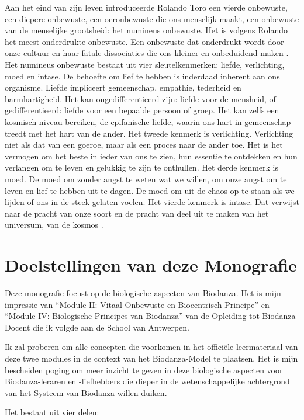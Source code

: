 \documentclass[
  11pt,
]{book}
\begin{document}
Aan het eind van zijn leven introduceerde Rolando Toro een vierde onbewuste, een diepere onbewuste, een oeronbewuste die ons menselijk maakt, een onbewuste van de menselijke grootsheid: het numineus onbewuste. Het is volgens Rolando het meest onderdrukte onbewuste. Een onbewuste dat onderdrukt wordt door onze cultuur en haar fatale dissociaties die ons kleiner en onbeduidend maken \citep{toro2009}.
Het numineus onbewuste bestaat uit vier sleutelkenmerken: liefde, verlichting, moed en intase. De behoefte om lief te hebben is inderdaad inherent aan ons organisme. Liefde impliceert gemeenschap, empathie, tederheid en barmhartigheid. Het kan ongedifferentieerd zijn: liefde voor de mensheid, of gedifferentieerd: liefde voor een bepaalde persoon of groep. Het kan zelfs een kosmisch niveau bereiken, de epifanische liefde, waarin ons hart in gemeenschap treedt met het hart van de ander. Het tweede kenmerk is verlichting. Verlichting niet als dat van een goeroe, maar als een proces naar de ander toe. Het is het vermogen om het beste in ieder van ons te zien, hun essentie te ontdekken en hun verlangen om te leven en gelukkig te zijn te onthullen. Het derde kenmerk is moed. De moed om zonder angst te weten wat we willen, om onze angst om te leven en lief te hebben uit te dagen. De moed om uit de chaos op te staan als we lijden of ons in de steek gelaten voelen. Het vierde kenmerk is intase. Dat verwijst naar de pracht van onze soort en de pracht van deel uit te maken van het universum, van de kosmos \citep{toro2009}.
\newpage 

\section{Doelstellingen van deze Monografie}\label{doelstellingen-van-deze-monografie}

Deze monografie focust op de biologische aspecten van Biodanza. Het is mijn impressie van ``Module II: Vitaal Onbewuste en Biocentrisch Principe'' en ``Module IV: Biologische Principes van Biodanza'' van de Opleiding tot Biodanza Docent die ik volgde aan de School van Antwerpen.

Ik zal proberen om alle concepten die voorkomen in het officiële leermateriaal van deze twee modules in de context van het Biodanza-Model te plaatsen. Het is mijn bescheiden poging om meer inzicht te geven in deze biologische aspecten voor Biodanza-leraren en -liefhebbers die dieper in de wetenschappelijke achtergrond van het Systeem van Biodanza willen duiken.

Het bestaat uit vier delen:
\end{document}
